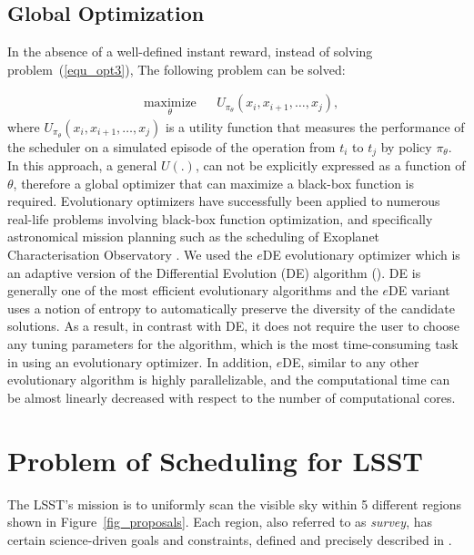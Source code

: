 \documentclass[12pt]{aastex62}
\theoremstyle{definition}
\begin{document}
\subsection{Global Optimization}\label{sec_gopt}
In the absence of a well-defined instant reward, instead of solving problem~(\ref{equ_opt3}), The following problem can be solved:

\begin{equation}%
\begin{aligned}
& \underset{\theta}{\text{maximize}}
& & U_{\pi_{\theta}}(x_i,x_{i+1}, \dots, x_{j}),
\end{aligned}
\end{equation}
where $U_{\pi_{\theta}}(x_i,x_{i+1}, \dots, x_{j})$ is a utility function that measures the performance of the scheduler on a simulated episode of the operation from $t_i$ to $t_j$ by policy $\pi_{\theta}$. In this approach, a general $U(.)$, can not be explicitly expressed as a function of $\theta$, therefore a global optimizer that can maximize a black-box function is required. Evolutionary optimizers have successfully been applied to numerous real-life problems involving black-box function optimization, and specifically astronomical mission planning such as the scheduling of Exoplanet Characterisation Observatory \citep{garcia2015artificial}. We used the $e$DE evolutionary optimizer \citep{naghib2016entropic} which is an adaptive version of the Differential Evolution (DE) algorithm (\citep{storn1997differential}). DE is generally one of the most efficient evolutionary algorithms and the $e$DE variant uses a notion of entropy to automatically preserve the diversity of the candidate solutions. As a result, in contrast with DE, it does not require the user to choose any tuning parameters for the algorithm, which is the most time-consuming task in using an evolutionary optimizer. In addition, $e$DE, similar to any other evolutionary algorithm is highly parallelizable, and the computational time can be almost linearly decreased with respect to the number of computational cores.

\section{Problem of Scheduling for LSST}\label{sec_lsst_problem}

The LSST's mission is to uniformly scan the visible sky within 5 different regions shown in Figure~\ref{fig_proposals}. Each region, also referred to as \textit{survey}, has certain science-driven goals and constraints, defined and precisely described in \citep{ivezic2008large}.
\end{document}
